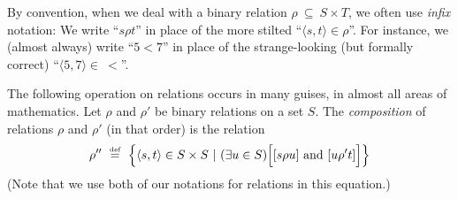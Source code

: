 By convention, when we deal with a binary relation $\rho \ \subseteq \ S \times T$, we often use {\em infix} notation: We write ``$s \rho t$'' in place of the more stilted ``$\langle s, t \rangle \in \rho$''.  For instance, we (almost always) write ``$5 < 7$'' in place of the strange-looking (but formally correct) ``$\langle 5,7 \rangle \in \ <$''.

\medskip


The following operation on relations occurs in many guises, in almost all areas of mathematics.  Let $\rho$ and $\rho'$ be binary relations on a set $S$.  The {\it composition} of relations $\rho$ and $\rho'$ (in that order) is the relation
\[ 
\rho'' \ \eqdef \ \Bigl\{ \langle s, t \rangle \in S \times S \ | \
(\exists u \in S) \Bigl[ [s \rho u] \mbox{ and } [u \rho' t] \Bigr] \Bigr\}
\]
(Note that we use both of our notations for relations in this equation.) 

\bigskip

\noindent {}
\bigskip

